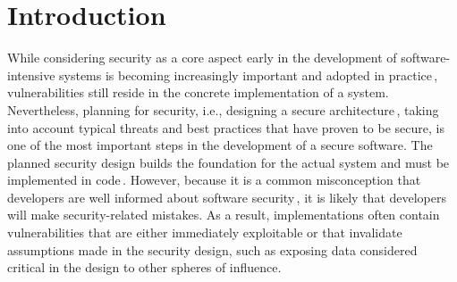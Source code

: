\section{Introduction}
\label{sec:intro}
\noindent
While considering security as a core aspect early in the development of software-intensive systems is becoming increasingly important and adopted in practice\,\cite{10.1145/3468264.3473926,Peldszus2025}, vulnerabilities still reside in the concrete implementation of a system.
Nevertheless, planning for security, i.e., designing a secure architecture\,\cite{1281254}, taking into account typical threats and best practices that have proven to be secure, is one of the most important steps in the development of a secure software.
The planned security design builds the foundation for the actual system and must be implemented in code\,\cite{1281254,10.1145/3385678.3385687}.
However, because it is a common misconception that developers are well informed about software security\,\cite{Ryan2023}, it is likely that developers will make security-related mistakes. As a result, implementations often contain vulnerabilities that are either immediately exploitable or that invalidate assumptions made in the security design, such as exposing data considered critical in the design to other spheres of influence.%

